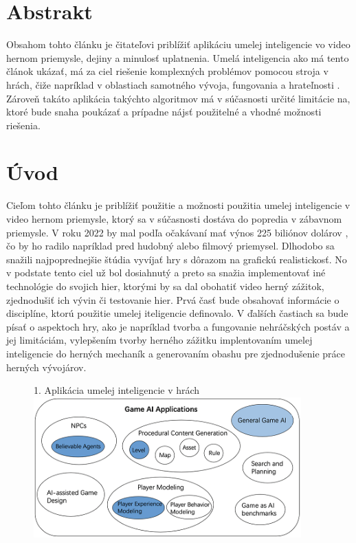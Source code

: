 \documentclass{article}
\author{Ondrej Podhorsky\\[2pt]
	{\small Slovenská technická univerzita v Bratislave}\\
	{\small Fakulta informatiky a informačných technológií}\\
	{\small \texttt{xpodhorsky@stuba.sk}}
	}
\date{\small 6. november 2022}
\begin{document}
\maketitle

\section{Abstrakt}

Obsahom tohto článku je čitateľovi priblížiť aplikáciu umelej inteligencie vo video hernom priemysle, dejiny a minulosť uplatnenia. Umelá inteligencia ako má tento článok ukázať, má za ciel riešenie komplexných problémov pomocou stroja v hrách, čiže napríklad v oblastiach samotného vývoja, fungovania a hrateľnosti . Zároveň takáto aplikácia takýchto algoritmov má v súčasnosti určité limitácie na, ktoré bude snaha poukázať a prípadne nájsť použitelné a vhodné možnosti riešenia.

\clearpage

\section{Úvod}

Cieľom tohto článku je priblížiť použitie a možnosti použitia umelej inteligencie v video hernom priemysle, ktorý sa v súčasnosti dostáva do popredia v zábavnom priemysle. V roku 2022 by mal podľa očakávaní mať výnos 225 biliónov dolárov \cite{TeodoraDobrilovat}, čo by ho radilo napríklad pred hudobný alebo filmový priemysel. Dlhodobo sa snažili najpoprednejšie štúdia vyvíjať hry s dôrazom  na grafickú realistickosť. No v podstate tento ciel už bol dosiahnutý a preto sa snažia implementovať iné technológie do svojich hier, ktorými by sa dal obohatiť video herný zážitok, zjednodušiť ich vývin či testovanie hier. Prvá časť bude obsahovať informácie o disciplíne, ktorú použitie umelej iteligencie definovalo. V ďalších častiach sa bude písať o aspektoch hry, ako je napríklad tvorba a fungovanie nehráčských postáv a jej limitáciám, vylepšením tvorby herného zážitku implentovaním umelej inteligencie do herných mechaník a generovaním obashu pre zjednodušenie práce herných vývojárov.

\begin{figure}{1. Aplikácia umelej inteligencie v hrách\cite{inproceedings}}
\centering
\includegraphics[width=103mm]{Game-AI-Applications.png}
\end{figure}
\end{document}

